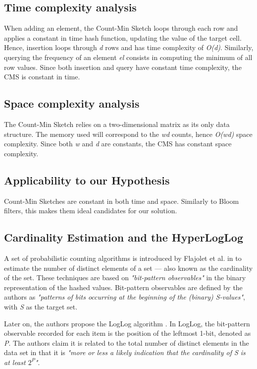 \subsection*{Time complexity analysis}
When adding an element, the Count-Min Sketch loops through each row and applies a constant in time hash function, updating the value of the target cell. Hence, insertion loops through \textit{d} rows and has time complexity of \textit{O(d)}. Similarly, querying the frequency of an element \textit{el} consists in computing the minimum of all row values. Since both insertion and query have constant time complexity, the CMS is constant in time.

\subsection*{Space complexity analysis}
The Count-Min Sketch relies on a two-dimensional matrix as its only data structure. The memory used will correspond to the \textit{wd} counts, hence \textit{O(wd)} space complexity. Since both \textit{w} and \textit{d} are constants, the CMS has constant space complexity.

\subsection*{Applicability to our Hypothesis}
Count-Min Sketches are constant in both time and space. Similarly to Bloom filters, this makes them ideal candidates for our solution. 

\subsection{Cardinality Estimation and the HyperLogLog} \label{sec:hyper-log-log}

A set of probabilistic counting algorithms is introduced by Flajolet et al. in \cite{Flajolet-PCA} to estimate the number of distinct elements of a set --- also known as the cardinality of the set. These techniques are based on \textit{"bit-pattern observables"} in the binary representation of the hashed values. Bit-pattern observables are defined by the authors as \textit{"patterns of bits occurring at the beginning of the (binary) S-values"}, with \textit{S} as the target set.

Later on, the authors propose the LogLog algorithm \cite{Flajolet-LogLog}. In LogLog, the bit-pattern observable recorded for each item is the position of the leftmost 1-bit, denoted as \textit{P}. The authors claim it is related to the total number of distinct elements in the data set in that it is \textit{"more or less a likely indication that the cardinality of S is at least $2^P$"}.


